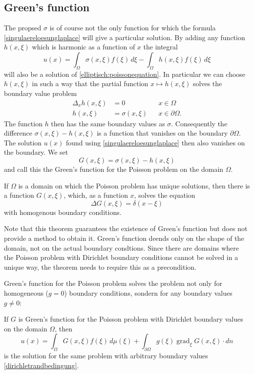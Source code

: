 \subsection{Green's function}
The propsed $\sigma$ is of course not the only function for which
the formula \eqref{singulaereloesunglaplace} will give a particular solution.
By adding any function $h(x,\xi)$ which is harmonic as a function of $x$
the integral
\[
u(x)=\int_{\Omega}\sigma(x,\xi)f(\xi)\,d\xi-\int_{\Omega}h(x,\xi)f(\xi)\,d\xi
\]
will also be a solution of
\eqref{elliptisch:poissonequation}.
In particular we can choose $h(x,\xi)$ in such a way that
the partial function
$x\mapsto h(x,\xi)$
solves the boundary value problem
\[
\begin{aligned}
\Delta_x h(x,\xi)&=0&&x\in\Omega\\
h(x,\xi)&=\sigma(x,\xi)&&x\in\partial\Omega.
\end{aligned}
\]
The function $h$ then has the same boundary values as $\sigma$.
Consequently the difference $\sigma(x,\xi)-h(x,\xi)$ is a function
that vanishes on the boundary $\partial\Omega$.
The solution $u(x)$ found using \eqref{singulaereloesunglaplace}
then also vanishes on the boundary.
We set
\[
G(x,\xi)=\sigma(x,\xi)-h(x,\xi)
\]
and call this the Green's function for the Poisson problem on the
domain $\Omega$.

\begin{satz}If $\Omega$ is a domain on which the Poisson problem
has unique solutions, then there is a function $G(x,\xi)$,
which, as a function $x$, solves the equation
\[
\Delta G(x,\xi)=\delta(x-\xi)
\]
with homogenous boundary conditions.
\end{satz}

Note that this theorem guarantees the existence of Green's function 
but does not provide a method to obtain it.
Green's function deends only on the shape of the domain, not on
the actual boundary condtions.
Since there are domains where the Poisson problem with Dirichlet
boundary conditions cannot be solved in a unique way, the theorem
needs to require this as a precondition.

Green's function for the Poisson problem solves the problem
not only for homogeneous ($g=0$) boundary conditions, sondern
for any boundary values $g\ne 0$:

\begin{satz}
\label{dirichletloesung}
If $G$ is Green's function for the Poisson problem with Dirichlet
boundary values on the domain $\Omega$, then
\[
u(x)
=
\int_{\Omega}G(x,\xi)f(\xi)\,d\mu(\xi)
+
\int_{\partial\Omega}g(\xi)\operatorname{grad}_\xi G(x,\xi)\cdot dn
\]
is the solution for the same problem with arbitrary boundary values
\eqref{dirichletrandbedingung}.
\end{satz}

